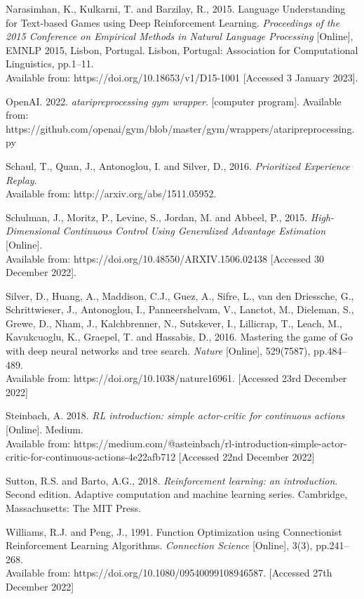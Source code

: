 \documentclass{article}
\begin{document}
Narasimhan, K., Kulkarni, T. and Barzilay, R., 2015. Language Understanding for Text-based Games using Deep Reinforcement Learning. \emph{Proceedings of the 2015 Conference on Empirical Methods in Natural Language Processing} [Online], EMNLP 2015, Lisbon, Portugal. Lisbon, Portugal: Association for Computational Linguistics, pp.1–11. \\
Available from: https://doi.org/10.18653/v1/D15-1001 [Accessed 3 January 2023].

OpenAI. 2022. \emph{ataripreprocessing gym wrapper}. [computer program]. Available from: https://github.com/openai/gym/blob/master/gym/wrappers/ataripreprocessing.py

Schaul, T., Quan, J., Antonoglou, I. and Silver, D., 2016. \emph{Prioritized Experience Replay}. \\
Available from: http://arxiv.org/abs/1511.05952.

Schulman, J., Moritz, P., Levine, S., Jordan, M. and Abbeel, P., 2015. \emph{High-Dimensional Continuous Control Using Generalized Advantage Estimation}  [Online]. \\
Available from: https://doi.org/10.48550/ARXIV.1506.02438 [Accessed 30 December 2022].

Silver, D., Huang, A., Maddison, C.J., Guez, A., Sifre, L., van den Driessche, G., Schrittwieser, J., Antonoglou, I., Panneershelvam, V., Lanctot, M., Dieleman, S., Grewe, D., Nham, J., Kalchbrenner, N., Sutskever, I., Lillicrap, T., Leach, M., Kavukcuoglu, K., Graepel, T. and Hassabis, D., 2016. Mastering the game of Go with deep neural networks and tree search. \emph{Nature} [Online], 529(7587), pp.484–489. \\
Available from: https://doi.org/10.1038/nature16961. [Accessed 23rd December 2022]

Steinbach, A. 2018. \emph{RL introduction: simple actor-critic for continuous actions} [Online]. Medium. \\
Available from: https://medium.com/@asteinbach/rl-introduction-simple-actor-critic-for-continuous-actions-4e22afb712 [Accessed 22nd December 2022]

Sutton, R.S. and Barto, A.G., 2018. \emph{Reinforcement learning: an introduction}. Second edition. Adaptive computation and machine learning series. Cambridge, Massachusetts: The MIT Press.

Williams, R.J. and Peng, J., 1991. Function Optimization using Connectionist Reinforcement Learning Algorithms. \emph{Connection Science} [Online], 3(3), pp.241–268. \\
Available from: https://doi.org/10.1080/09540099108946587. [Accessed 27th December 2022]
\end{document}
